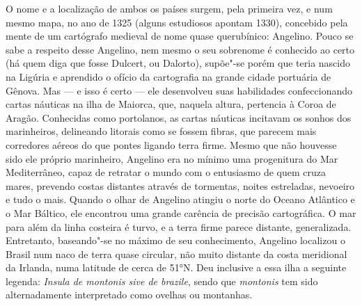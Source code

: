 O nome e a localização de ambos os países surgem, pela primeira vez, e
num mesmo mapa, no ano de 1325 (alguns estudiosos apontam 1330),
concebido pela mente de um cartógrafo medieval de nome quase
querubínico: Angelino. Pouco se sabe a respeito desse Angelino, nem
mesmo o seu sobrenome é conhecido ao certo (há quem diga que fosse
Dulcert, ou Dalorto), supõe"-se porém que teria nascido na Ligúria e
aprendido o ofício da cartografia na grande cidade portuária de Gênova.
Mas --- e isso é certo --- ele desenvolveu suas habilidades confeccionando
cartas náuticas na ilha de Maiorca, que, naquela altura, pertencia à
Coroa de Aragão. Conhecidas como portolanos, as cartas náuticas
incitavam os sonhos dos marinheiros, delineando litorais como se fossem
fibras, que parecem mais corredores aéreos do que pontes ligando terra
firme. Mesmo que não houvesse sido ele próprio marinheiro, Angelino era
no mínimo uma progenitura do Mar Mediterrâneo, capaz de retratar o mundo
com o entusiasmo de quem cruza mares, prevendo costas distantes através
de tormentas, noites estreladas, nevoeiro e tudo o mais. Quando o olhar
de Angelino atingiu o norte do Oceano Atlântico e o Mar Báltico, ele
encontrou uma grande carência de precisão cartográfica. O mar para além
da linha costeira é turvo, e a terra firme parece distante,
generalizada. Entretanto, baseando"-se no máximo de seu conhecimento,
Angelino localizou o Brasil num naco de terra quase circular, não muito
distante da costa meridional da Irlanda, numa latitude de cerca de 51°N.
Deu inclusive a essa ilha a seguinte legenda: \emph{Insula de montonis
sive de brazile}, sendo que \emph{montonis} tem sido alternadamente
interpretado como ovelhas ou montanhas.


